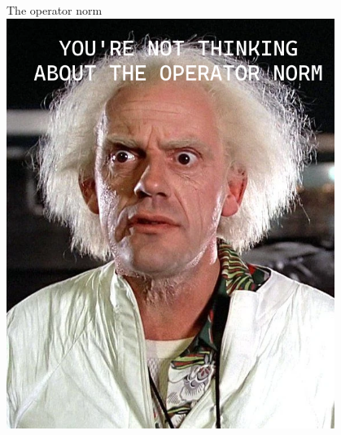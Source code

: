 \documentclass[10pt]{beamer}
\begin{document}
\begin{frame}{The operator norm}
    \centering
    \includegraphics[width=0.8\textwidth]{operator_norm}
\end{frame}
\end{document}
